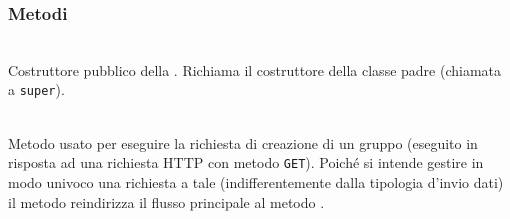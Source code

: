 \subsubsection*{Metodi}

\begin{description}
	\item{}\\
	Costruttore pubblico della . Richiama il costruttore della classe padre (chiamata a \texttt{super}).
	
	\item{}\\
	Metodo usato per eseguire la richiesta di creazione di un gruppo (eseguito in risposta ad una richiesta HTTP con metodo \texttt{GET}). Poiché si intende gestire in modo univoco una richiesta a tale  (indifferentemente dalla tipologia d'invio dati) il metodo reindirizza il flusso principale al metodo .
	

\end{description}
